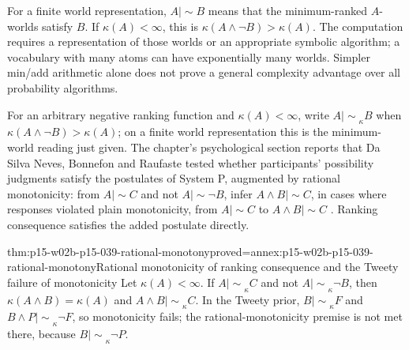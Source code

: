 For a finite world representation, \(A\mathrel{|\!\sim}B\) means that
the minimum-ranked \(A\)-worlds satisfy \(B\).  If
\(\kappa(A)<\infty\), this is
\(\kappa(A\land\neg B)>\kappa(A)\).
The computation requires a representation of those worlds or an appropriate
symbolic algorithm; a vocabulary with many atoms can have exponentially
many worlds.  Simpler min/add arithmetic alone does not prove a general
complexity advantage over all probability algorithms.

For an arbitrary negative ranking function and \(\kappa(A)<\infty\), write
\(A\mathrel{|\!\sim}_\kappa B\) when \(\kappa(A\land\neg B)>\kappa(A)\);
on a finite world representation this is the minimum-world reading just given.
The chapter's psychological section reports that Da Silva Neves, Bonnefon and
Raufaste tested whether participants' possibility judgments satisfy the
postulates of System P, augmented by rational monotonicity: from
\(A\mathrel{|\!\sim}C\) and not \(A\mathrel{|\!\sim}\neg B\), infer
\(A\land B\mathrel{|\!\sim}C\), in cases where responses violated plain
monotonicity, from \(A\mathrel{|\!\sim}C\) to \(A\land B\mathrel{|\!\sim}C\)
\parencite[p.~342 and p.~344, n.~9]{KernIsbernerSkovgaardOlsenSpohn2021Ranking}.
Ranking consequence satisfies the added postulate directly.

\begin{hbtheorem}{thm:p15-w02b-p15-039-rational-monotony}{proved=annex:p15-w02b-p15-039-rational-monotony}{Rational monotonicity of ranking consequence and the Tweety failure of monotonicity}
Let \(\kappa(A)<\infty\).  If \(A\mathrel{|\!\sim}_\kappa C\) and not
\(A\mathrel{|\!\sim}_\kappa\neg B\), then \(\kappa(A\land B)=\kappa(A)\)
and \(A\land B\mathrel{|\!\sim}_\kappa C\).
In the Tweety prior, \(B\mathrel{|\!\sim}_\kappa F\) and
\(B\land P\mathrel{|\!\sim}_\kappa\neg F\), so monotonicity fails; the
rational-monotonicity premise is not met there, because
\(B\mathrel{|\!\sim}_\kappa\neg P\).
\end{hbtheorem}

